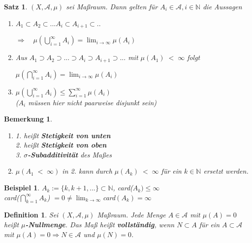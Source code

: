 \documentclass[11pt]{memoir}
\theoremstyle{changebreak}
\newtheorem{Definition}{Definition}[chapter]
\newtheorem{Bemerkung}{Bemerkung}[chapter]
\newtheorem{Beispiel}{Beispiel}[chapter]
\newtheorem{Satz}{Satz}[chapter]
\begin{document}
\begin{Satz}
$(X, \mathscr{A}, \mu)$ sei Maßraum. Dann gelten für $A_i \in \mathscr{A}, i \in \mathbb{N}$ die Aussagen
\begin{enumerate}
	\item $A_1 \subset A_2 \subset ...  A_i \subset A_{i+1} \subset .. $
	\begin{center}
		$\Rightarrow \quad \mu(\bigcup\limits_{i=1}^{\infty} A_i) = \lim_{i \rightarrow \infty} \mu(A_i)$
	\end{center}
	\item Aus $A_1 \supset A_2 \supset ... \supset A_i \supset A_{i+1} \supset ...$ mit $\mu(A_1)\; < \;  \infty$ folgt
	\begin{center}
		$\mu(\bigcap\limits_{i=1}^{\infty} A_i) = \lim_{i \rightarrow \infty} \mu(A_i)$
	\end{center}
	\item $\mu(\bigcup\limits_{i=1}^{\infty} A_i) \leq \sum\limits_{i=1}^{\infty} \mu(A_i)$ \\
	($A_i$ müssen hier nicht paarweise disjunkt sein)
\end{enumerate}
\end{Satz}

\begin{Bemerkung}
\begin{enumerate}
	\item \emph{1.} heißt \textbf{Stetigkeit von unten} \\
	\emph{2.} heißt \textbf{Stetigkeit von oben} \\
	\emph{3.} \textbf{$\sigma$-Subadditivität} des Maßes
	\item  $\mu(A_1\; < \;\infty)$ in \emph{2.} kann durch $\mu(A_k) \; < \;\infty$ für ein $k \in \mathbb{N}$ ersetzt werden.
\end{enumerate}
\end{Bemerkung}

\begin{Beispiel}
$A_k := \{k, k+1, ... \} \subset \mathbb{N}$, card($A_k) \leq \infty$ \\
card($\bigcap\limits_{k=1}^{\infty} A_k$) $= 0 \ne \lim_{k \rightarrow \infty} $card$ (A_k) = \infty$
\end{Beispiel}

\begin{Definition}
Sei $(X, \mathscr{A}, \mu)$ Maßraum. Jede Menge $A \in \mathscr{A}$ mit $\mu(A) = 0$ heißt \textbf{$\mu$-Nullmenge}. Das Maß heißt \textbf{vollständig}, wenn $N \subset A $ für ein $A \subset \mathscr{A}$ mit $\mu(A) = 0 \Rightarrow N \in \mathscr{A}$ und $\mu(N) = 0$.
\end{Definition}
\end{document}
